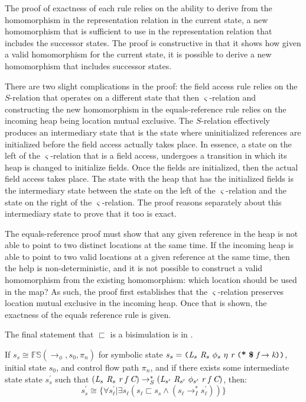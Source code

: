 The proof of exactness of each rule relies on the ability to derive
from the homomorphism in the representation relation in the current
state, a new homomorphism that is sufficient to use in the
representation relation that includes the successor states. The proof
is constructive in that it shows how given a valid homomorphism for
the current state, it is possible to derive a new homomorphism that
includes successor states.

There are two slight complications in the proof: the field access rule
relies on the $S$-relation that operates on a different state that
then $\varsigma$-relation and constructing the new homomorphism in the
equals-reference rule relies on the incoming heap being location
mutual exclusive. The $S$-relation effectively produces an
intermediary state that is the state where uninitialized references
are initialized before the field access actually takes place. In
essence, a state on the left of the $\varsigma$-relation that is a
field access, undergoes a transition in which its heap is changed to
initialize fields. Once the fields are initialized, then the actual
field access takes place. The state with the heap that has the
initialized fields is the intermediary state between the state on the
left of the $\varsigma$-relation and the state on the right of the
$\varsigma$-relation. The proof reasons separately about this
intermediary state to prove that it too is exact.

The equals-reference proof must show that any given reference in the
heap is not able to point to two distinct locations at the same
time. If the incoming heap is able to point to two valid locations at
a given reference at the same time, then the help is
non-deterministic, and it is not possible to construct a valid
homomorphism from the existing homomorphism: which location should be
used in the map? As such, the proof first establishes that
the $\varsigma$-relation preserves location mutual exclusive in the
incoming heap. Once that is shown, the exactness of the equals
reference rule is given.

The final statement that $\sqsubset$ is a bisimulation is in .

\begin{lemma}
\label{lem:init}
If $s_s \cong \mathbb{FS}(\rightarrow_{\phi},s_0,\pi_n)$ for symbolic state $s_s = \lp \cfgnt{L}_s\ \cfgnt{R}_{s}\ \phi_s\ \eta\ \cfgnt{r}\ \lp \cfgt{*}\ \cfgt{\$}\ \cfgnt{f} \rightarrow \cfgnt{k}\rp \rp$, initial state $s_0$, and control flow path $\pi_n$, and if there exists some intermediate state state $s_s^\prime$ such that $(\cfgnt{L}_s\ \cfgnt{R}_{s}\ \cfgnt{r}\ \cfgnt{f} \ \cfgnt{C}) \rightarrow_S^* (\cfgnt{L}_{s^\prime}\ \cfgnt{R}_{s^\prime}\ \phi_{s^\prime}\ \cfgnt{r}\ \cfgnt{f} \ \cfgnt{C})$, then:
 $$s_s^\prime \cong \{\forall s_\ell^\prime | \exists s_\ell (s_\ell \sqsubset s_s \wedge (s_\ell \rightarrow_I^* s_\ell^\prime) ) \}$$
\end{lemma}

